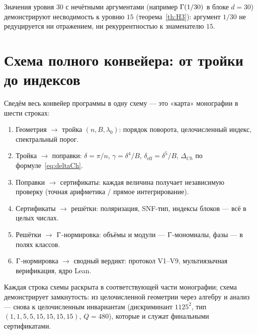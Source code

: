 Значения уровня $30$ с нечётными аргументами (например
$\Gamma(1/30)$ в блоке $d=30$) демонстрируют несводимость к уровню
$15$ (теорема~\ref{th:H3}): аргумент $1/30$ не редуцируется ни
отражением, ни рекуррентностью к знаменателю $15$.

\section{Схема полного конвейера: от тройки до индексов}
\label{sec:pipeline}

Сведём весь конвейер программы в одну схему --- это
«карта» монографии в шести строках:
\begin{enumerate}[leftmargin=2em, itemsep=0.15em]
\item Геометрия $\to$ тройка $(n,B,\lambda_0)$: порядок поворота,
  целочисленный индекс, спектральный порог.
\item Тройка $\to$ поправки: $\delta=\pi/n$, $\gamma=\delta^4/B$,
  $\delta_{\mathrm{eff}}=\delta^5/B$, $\Delta_{Ch}$
  по формуле~\eqref{eq:deltaCh}.
\item Поправки $\to$ сертификаты: каждая величина получает
  независимую проверку (точная арифметика / прямое интегрирование).
\item Сертификаты $\to$ решётки: поляризация, SNF-тип, индексы
  блоков --- всё в целых числах.
\item Решётки $\to$ $\Gamma$-нормировка: объёмы и модули ---
  $\Gamma$-мономиалы, фазы --- в полях классов.
\item $\Gamma$-нормировка $\to$ сводный вердикт: протокол V1--V9,
  мультиязычная верификация, ядро Lean.
\end{enumerate}
Каждая строка схемы раскрыта в соответствующей части монографии;
схема демонстрирует замкнутость: из целочисленной геометрии через
алгебру и анализ --- снова к целочисленным инвариантам
(дискриминант $1125^2$, тип $(1,1,5,5,15,15,15,15)$, $Q=480$),
которые и служат финальными сертификатами.
